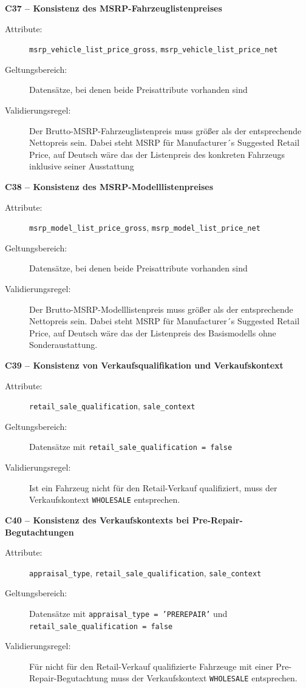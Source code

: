 \documentclass[../main.tex]{subfiles}
\begin{document}
\medskip 
\noindent\textbf{C37 -- Konsistenz des MSRP-Fahrzeuglistenpreises} 
\begin{description} 
    \item[Attribute:] \texttt{msrp\_vehicle\_list\_price\_gross}, \texttt{msrp\_vehicle\_list\_price\_net} 
    \item[Geltungsbereich:] Datensätze, bei denen beide Preisattribute vorhanden sind 
    \item[Validierungsregel:] Der Brutto-MSRP-Fahrzeuglistenpreis muss größer als der entsprechende Nettopreis sein. Dabei steht MSRP für Manufacturer´s Suggested Retail Price, auf Deutsch wäre das der Listenpreis des konkreten Fahrzeugs inklusive seiner Ausstattung
\end{description} 

\medskip 
\noindent\textbf{C38 -- Konsistenz des MSRP-Modelllistenpreises} 
\begin{description} 
    \item[Attribute:] \texttt{msrp\_model\_list\_price\_gross}, \texttt{msrp\_model\_list\_price\_net} 
    \item[Geltungsbereich:] Datensätze, bei denen beide Preisattribute vorhanden sind 
    \item[Validierungsregel:] Der Brutto-MSRP-Modelllistenpreis muss größer als der entsprechende Nettopreis sein. Dabei steht MSRP für Manufacturer´s Suggested Retail Price, auf Deutsch wäre das der Listenpreis des Basismodells ohne Sonderaustattung.
\end{description} 

\medskip 
\noindent\textbf{C39 -- Konsistenz von Verkaufsqualifikation und Verkaufskontext} 
\begin{description} 
    \item[Attribute:] \texttt{retail\_sale\_qualification}, \texttt{sale\_context} 
    \item[Geltungsbereich:] Datensätze mit \texttt{retail\_sale\_qualification = false} 
    \item[Validierungsregel:] Ist ein Fahrzeug nicht für den Retail-Verkauf qualifiziert, muss der Verkaufskontext \texttt{WHOLESALE} entsprechen. 
\end{description} 

\medskip 
\noindent\textbf{C40 -- Konsistenz des Verkaufskontexts bei Pre-Repair-Begutachtungen} 
\begin{description} 
    \item[Attribute:] \texttt{appraisal\_type}, \texttt{retail\_sale\_qualification}, \texttt{sale\_context} 
    \item[Geltungsbereich:] Datensätze mit \texttt{appraisal\_type = 'PREREPAIR'} und \texttt{retail\_sale\_qualification = false} 
    \item[Validierungsregel:] Für nicht für den Retail-Verkauf qualifizierte Fahrzeuge mit einer Pre-Repair-Begutachtung muss der Verkaufskontext \texttt{WHOLESALE} entsprechen. 
\end{description} 
\end{document}
